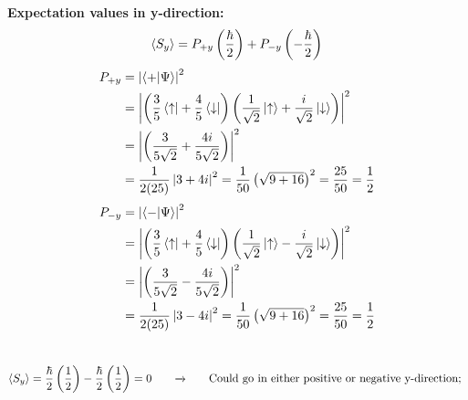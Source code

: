\documentclass[12pt]{article}
\begin{document}
\textbf{Expectation values in y-direction:} \\
\[
    \braket{S_y} = P_{+y}\left(\frac{\hbar}{2}\right) + P_{-y}\left(-\frac{\hbar}{2}\right)
\]
\begin{equation}
    \begin{split}
        P_{+y} &= \left|\braket{+|\Psi}\right|^2 \\
        &= \left|\left(\frac{3}{5}\bra{\uparrow} + \frac{4}{5}\bra{\downarrow}\right)\left(\frac{1}{\sqrt{2}}\ket{\uparrow} + \frac{i}{\sqrt{2}}\ket{\downarrow}\right)\right|^2 \\
        &= \left|\left( \frac{3}{5\sqrt{2}} + \frac{4i}{5\sqrt{2}}\right)\right|^2 \\
        &= \frac{1}{2(25)}\left| 3 + 4i \right|^2 = \frac{1}{50}\left(\sqrt{9 + 16}\right)^2 = \frac{25}{50} = \frac{1}{2} \\
    \end{split}
\end{equation}
\begin{equation}
    \begin{split}
        P_{-y} &= \left|\braket{-|\Psi}\right|^2 \\
        &= \left|\left(\frac{3}{5}\bra{\uparrow} + \frac{4}{5}\bra{\downarrow}\right)\left(\frac{1}{\sqrt{2}}\ket{\uparrow} - \frac{i}{\sqrt{2}}\ket{\downarrow}\right)\right|^2 \\
        &= \left|\left( \frac{3}{5\sqrt{2}} - \frac{4i}{5\sqrt{2}}\right)\right|^2 \\
        &= \frac{1}{2(25)}\left|3 - 4i\right|^2 = \frac{1}{50}\left(\sqrt{9 + 16}\right)^2 = \frac{25}{50} = \frac{1}{2}\\ 
    \end{split}
\end{equation} \\
\begin{equation}
    \begin{split}
        \braket{S_y} &= \frac{\hbar}{2}\left(\frac{1}{2}\right) - \frac{\hbar}{2}\left(\frac{1}{2}\right) = 0 \text{\qquad \rightarrowfill \qquad Could go in either positive or negative y-direction; } \\\\
    \end{split}
\end{equation}
\end{document}
